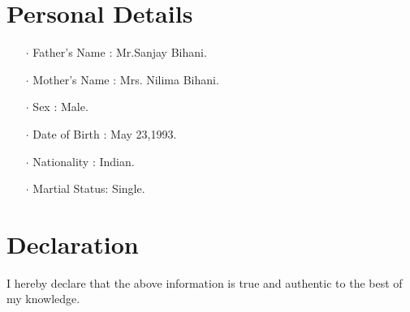 \documentclass[12pt]{article}
\begin{document}
\section*{Personal Details}
\begin{itemize}
\item[$\cdot$]Father's Name : Mr.Sanjay Bihani.
\item[$\cdot$]Mother's Name : Mrs. Nilima Bihani.
\item[$\cdot$]Sex           : Male.
\item[$\cdot$]Date of Birth : May 23,1993.
\item[$\cdot$]Nationality   : Indian.
\item[$\cdot$]Martial Status: Single.
\end{itemize}
\section*{Declaration} I hereby declare that the above information is true and authentic to the best of my knowledge.
\end{document}
